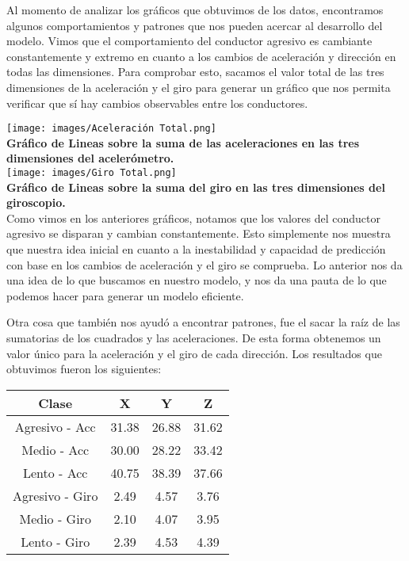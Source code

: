 \documentclass{article}
\begin{document}
        Al momento de analizar los gráficos que obtuvimos de los datos, encontramos algunos comportamientos y patrones que nos pueden acercar al desarrollo del modelo. Vimos que el comportamiento del conductor agresivo es cambiante constantemente y extremo en cuanto a los cambios de aceleración y dirección en todas las dimensiones. Para comprobar esto, sacamos el valor total de las tres dimensiones de la aceleración y el giro para generar un gráfico que nos permita verificar que sí hay cambios observables entre los conductores.

        \texttt{[image: images/Aceleración Total.png]} \\

        \textbf{Gráfico de Lineas sobre la suma de las aceleraciones en las tres dimensiones del acelerómetro.} \\

        \texttt{[image: images/Giro Total.png]} \\

        \textbf{Gráfico de Lineas sobre la suma del giro en las tres dimensiones del giroscopio.} \\

        Como vimos en los anteriores gráficos, notamos que los valores del conductor agresivo se disparan y cambian constantemente. Esto simplemente nos muestra que nuestra idea inicial en cuanto a la inestabilidad y capacidad de predicción con base en los cambios de aceleración y el giro se comprueba. Lo anterior nos da una idea de lo que buscamos en nuestro modelo, y nos da una pauta de lo que podemos hacer para generar un modelo eficiente.

        Otra cosa que también nos ayudó a encontrar patrones, fue el sacar la raíz de las sumatorias de los cuadrados y las aceleraciones. De esta forma obtenemos un valor único para la aceleración y el giro de cada dirección. Los resultados que obtuvimos fueron los siguientes: \\

        \begin{center}
        \begin{tabular}{||c c c c||} 
         \hline
         Clase & X & Y & Z \\ [0.5ex] 
         \hline\hline
         Agresivo - Acc & 31.38 & 26.88 & 31.62 \\ 
         \hline
         Medio - Acc & 30.00 & 28.22 & 33.42 \\
         \hline
         Lento - Acc & 40.75 & 38.39 & 37.66 \\
         \hline
         Agresivo - Giro & 2.49 & 4.57 & 3.76 \\
         \hline
         Medio - Giro & 2.10 & 4.07 & 3.95 \\ [1ex] 
         \hline
         Lento - Giro & 2.39 & 4.53 & 4.39 \\ [1ex] 
         \hline
        \end{tabular}
        \end{center}
\end{document}
